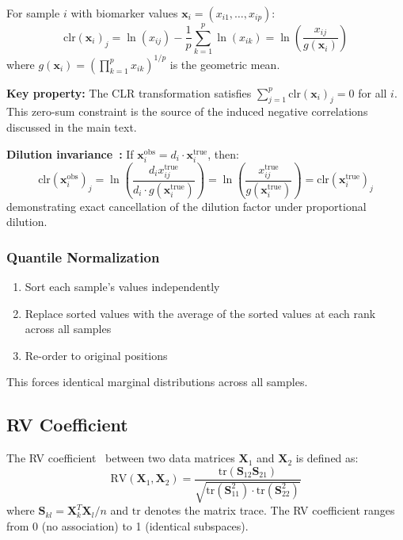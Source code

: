 \documentclass[12pt]{article}
\begin{document}
For sample $i$ with biomarker values $\mathbf{x}_i = (x_{i1}, \ldots, x_{ip})$:
\begin{equation}
\mathrm{clr}(\mathbf{x}_i)_j = \ln(x_{ij}) - \frac{1}{p} \sum_{k=1}^{p} \ln(x_{ik}) = \ln\left(\frac{x_{ij}}{g(\mathbf{x}_i)}\right)
\end{equation}
where $g(\mathbf{x}_i) = \left(\prod_{k=1}^{p} x_{ik}\right)^{1/p}$ is the geometric mean.

\textbf{Key property:} The CLR transformation satisfies $\sum_{j=1}^{p} \mathrm{clr}(\mathbf{x}_i)_j = 0$ for all $i$. This zero-sum constraint is the source of the induced negative correlations discussed in the main text.

\textbf{Dilution invariance~\cite{Aitchison1986}:} If $\mathbf{x}_i^{\mathrm{obs}} = d_i \cdot \mathbf{x}_i^{\mathrm{true}}$, then:
\begin{equation}
\mathrm{clr}(\mathbf{x}_i^{\mathrm{obs}})_j = \ln\left(\frac{d_i x_{ij}^{\mathrm{true}}}{d_i \cdot g(\mathbf{x}_i^{\mathrm{true}})}\right) = \ln\left(\frac{x_{ij}^{\mathrm{true}}}{g(\mathbf{x}_i^{\mathrm{true}})}\right) = \mathrm{clr}(\mathbf{x}_i^{\mathrm{true}})_j
\end{equation}
demonstrating exact cancellation of the dilution factor under proportional dilution.

\subsubsection{Quantile Normalization}

\begin{enumerate}
\item Sort each sample's values independently
\item Replace sorted values with the average of the sorted values at each rank across all samples
\item Re-order to original positions
\end{enumerate}

This forces identical marginal distributions across all samples.

\subsection{RV Coefficient}

The RV coefficient~\cite{Robert1976} between two data matrices $\mathbf{X}_1$ and $\mathbf{X}_2$ is defined as:
\begin{equation}
\mathrm{RV}(\mathbf{X}_1, \mathbf{X}_2) = \frac{\mathrm{tr}(\mathbf{S}_{12} \mathbf{S}_{21})}{\sqrt{\mathrm{tr}(\mathbf{S}_{11}^2) \cdot \mathrm{tr}(\mathbf{S}_{22}^2)}}
\end{equation}
where $\mathbf{S}_{kl} = \mathbf{X}_k^T \mathbf{X}_l / n$ and $\mathrm{tr}$ denotes the matrix trace. The RV coefficient ranges from 0 (no association) to 1 (identical subspaces).
\end{document}
